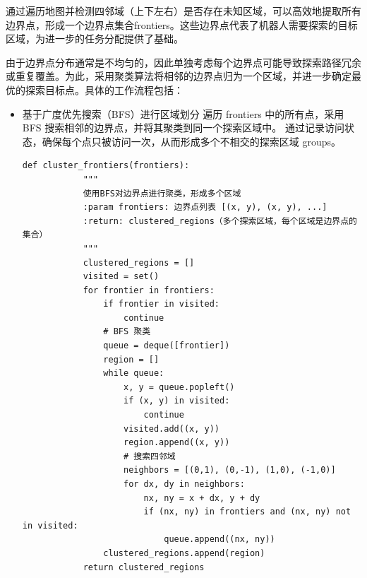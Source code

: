 通过遍历地图并检测四邻域（上下左右）是否存在未知区域，可以高效地提取所有边界点，形成一个边界点集合frontiers。这些边界点代表了机器人需要探索的目标区域，为进一步的任务分配提供了基础。

由于边界点分布通常是不均匀的，因此单独考虑每个边界点可能导致探索路径冗余或重复覆盖。为此，采用聚类算法将相邻的边界点归为一个区域，并进一步确定最优的探索目标点。具体的工作流程包括：
\begin{itemize}

    \item 基于广度优先搜索（BFS）进行区域划分
        遍历 frontiers 中的所有点，采用 BFS 搜索相邻的边界点，并将其聚类到同一个探索区域中。
        通过记录访问状态，确保每个点只被访问一次，从而形成多个不相交的探索区域 groups。
        \begin{lstlisting}[caption={使用BFS对边界点进行聚类，形成多个区域}]
        def cluster_frontiers(frontiers):
            """
            使用BFS对边界点进行聚类，形成多个区域
            :param frontiers: 边界点列表 [(x, y), (x, y), ...]
            :return: clustered_regions（多个探索区域，每个区域是边界点的集合）
            """
            clustered_regions = []
            visited = set()
            for frontier in frontiers:
                if frontier in visited:
                    continue
                # BFS 聚类
                queue = deque([frontier])
                region = []
                while queue:
                    x, y = queue.popleft()
                    if (x, y) in visited:
                        continue
                    visited.add((x, y))
                    region.append((x, y))
                    # 搜索四邻域
                    neighbors = [(0,1), (0,-1), (1,0), (-1,0)]
                    for dx, dy in neighbors:
                        nx, ny = x + dx, y + dy
                        if (nx, ny) in frontiers and (nx, ny) not in visited:
                            queue.append((nx, ny))
                clustered_regions.append(region)
            return clustered_regions
        \end{lstlisting}


\end{itemize}
